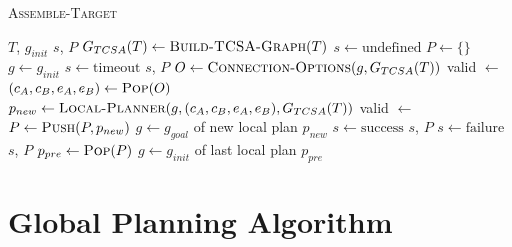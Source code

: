 \begin{algorithm}
	\caption{\scshape Assemble-Target}
	\label{algo:global_algo}
	\begin{algorithmic}[1]
		\REQUIRE $T$, $g_{init}$
		\ENSURE $s$, $P$ 
		\STATE $G_{TCSA}(T) \gets \text{\scshape Build-TCSA-Graph}(T)$
		\STATE $s \gets \text{undefined}$
		\STATE $P \gets \{\}$ 
		\STATE $g \gets g_{init}$ 
		\LOOP
				\STATE $s \gets \text{timeout}$
				\RETURN $s$, $P$
			\ENDIF
			\STATE $O \gets \text{\scshape Connection-Options}(g, G_{TCSA}(T))$
			\STATE valid $\gets$ \FALSE
				\STATE $(c_A, c_B, e_A, e_B) \gets \text{\scshape Pop}(O)$
				\STATE $p_{new} \gets \text{\scshape Local-Planner}(g, (c_A, c_B, e_A, e_B), G_{TCSA}(T))$
					\STATE valid $\gets$ \TRUE
				\ENDIF
			\ENDWHILE
				\STATE $P \gets \text{\scshape Push}(P, p_{new})$ 
				\STATE $g \gets g_{goal}$ of new local plan $p_{new}$ 
					\STATE $s \gets \text{success}$
					\RETURN $s$, $P$
				\ENDIF
			\ELSE
					\STATE $s \gets \text{failure}$
					\RETURN $s$, $P$
				\ENDIF
				\STATE $p_{pre} \gets \text{\scshape Pop}(P)$ 
				\STATE $g \gets g_{init}$ of last local plan $p_{pre}$ 
			\ENDIF
		\ENDLOOP
	\end{algorithmic}
\end{algorithm}


\section{Global Planning Algorithm}
\label{sec:global_algo}



